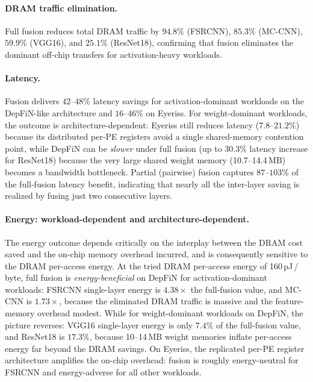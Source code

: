 \documentclass[11pt,a4paper,twocolumn]{article}
\begin{document}
\paragraph{DRAM traffic elimination.}
Full fusion reduces total DRAM traffic by $94.8\%$ (FSRCNN),
$85.3\%$ (MC-CNN), $59.9\%$ (VGG16), and $25.1\%$ (ResNet18),
confirming that fusion eliminates the dominant off-chip transfers
for activation-heavy workloads.

\paragraph{Latency.}
Fusion delivers $42$--$48\%$ latency savings for activation-dominant
workloads on the DepFiN-like architecture and $16$--$46\%$ on
Eyeriss.
For weight-dominant workloads, the outcome is architecture-dependent:
Eyeriss still reduces latency ($7.8$--$21.2\%$) because its
distributed per-PE registers avoid a single shared-memory contention
point, while DepFiN can be \emph{slower} under full fusion (up to
$30.3\%$ latency increase for ResNet18) because the very large
shared weight memory (10.7--14.4\,MB) becomes a bandwidth
bottleneck.
Partial (pairwise) fusion captures $87$--$103\%$ of the full-fusion
latency benefit, indicating that nearly all the inter-layer saving
is realized by fusing just two consecutive layers.

\paragraph{Energy: workload-dependent and architecture-dependent.}
The energy outcome depends critically on the interplay between the
DRAM cost saved and the on-chip memory overhead incurred, and is
consequently sensitive to the DRAM per-access energy.
At the tried DRAM per-access energy of 160\,pJ\,/\,byte, full fusion
is \emph{energy-beneficial} on DepFiN for activation-dominant
workloads: FSRCNN single-layer energy is $4.38\times$ the
full-fusion value, and MC-CNN is $1.73\times$, because the
eliminated DRAM traffic is massive and the feature-memory overhead
modest.
While for weight-dominant workloads on DepFiN, the picture reverses:
VGG16 single-layer energy is only $7.4\%$ of the full-fusion value,
and ResNet18 is $17.3\%$, because 10--14\,MB weight memories inflate
per-access energy far beyond the DRAM savings.
On Eyeriss, the replicated per-PE register architecture amplifies
the on-chip overhead: fusion is roughly energy-neutral for FSRCNN
and energy-adverse for all other workloads.
\end{document}
